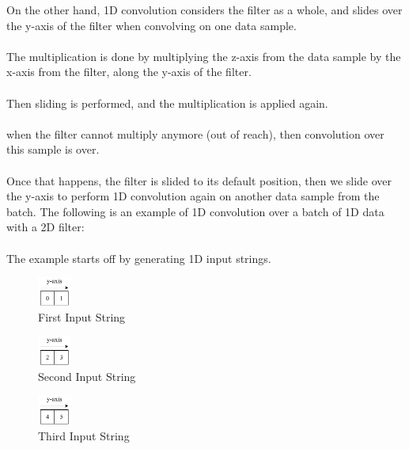 \documentclass[12pt]{article}
\newcommand\tab[1][1cm]{\hspace*{#1}}
\begin{document}
On the other hand, 1D convolution considers the filter as a whole, and slides over the y-axis of the filter when convolving on one data sample.\\\\
The multiplication is done by multiplying the z-axis from the data sample by the x-axis from the filter, along the y-axis of the filter.\\\\
Then sliding is performed, and the multiplication is applied again.\\\\
when the filter cannot multiply anymore (out of reach), then convolution over this sample is over.\\\\
Once that happens, the filter is slided to its default position, then we slide over the y-axis to perform 1D convolution again on another data sample from the batch.
\newpage
The following is an example of 1D convolution over a batch of 1D data with a 2D filter:\\\\
\tab The example starts off by generating 1D input strings.\\
\begin{figure}[!htbp]
		\begin{center}
			\includegraphics[width=0.1\textwidth]{input1}
			\caption{First Input String}
		\end{center}
\end{figure}	
\begin{figure}[!htbp]
\begin{center}
	\includegraphics[width=0.1\textwidth]{input2}
	\caption{Second Input String}
\end{center}
\end{figure}
\begin{figure}[!htbp]
\begin{center}
	\includegraphics[width=0.1\textwidth]{input3}
	\caption{Third Input String}
\end{center}
\end{figure}\\
\end{document}
